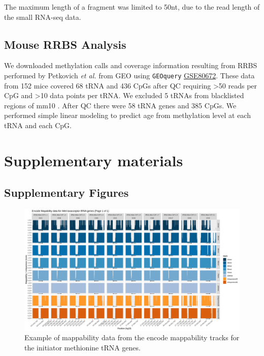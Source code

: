 \documentclass[
]{book}
\begin{document}
The maximum length of a fragment was limited to 50nt, due to the read length of the small RNA-seq data.

\hypertarget{mousemethods}{%
\subsection{Mouse RRBS Analysis}\label{mousemethods}}

We downloaded methylation calls and coverage information resulting from RRBS performed by Petkovich \emph{et al.} \citep{Petkovich2017} from GEO using \texttt{GEOquery} \citep{Davis2007p} \href{https://www.ncbi.nlm.nih.gov/geo/query/acc.cgi?acc=GSE80672}{GSE80672}.
These data from 152 mice covered 68 tRNA and 436 CpGs after QC requiring \textgreater50 reads per CpG and \textgreater10 data points per tRNA.
We excluded 5 tRNAs from blacklisted regions of mm10 \citep{Amemiya2019}.
After QC there were 58 tRNA genes and 385 CpGs.
We performed simple linear modeling to predict age from methylation level at each tRNA and each CpG.

\newpage

\hypertarget{supplementary-materials}{%
\section*{Supplementary materials}\label{supplementary-materials}}

\hypertarget{supplementary-figures}{%
\subsection{Supplementary Figures}\label{supplementary-figures}}

\begin{figure}

{\centering \includegraphics[width=1\linewidth]{./figs/mappability-iMet1} 

}

\caption{Example of mappability data from the encode mappability tracks \citep{Derrien2012} for the initiator methionine tRNA genes.}\label{fig:mappabilityiMet1}
\end{figure}
\end{document}
